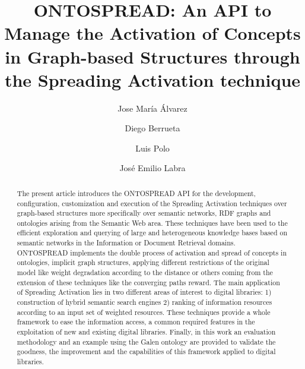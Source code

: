 \documentclass{llncs}
\begin{document}
\title{ONTOSPREAD: An API to Manage the Activation of Concepts in Graph-based Structures through the Spreading
Activation technique}


\author{Jose Mar\'{i}a \'{A}lvarez \and Diego Berrueta \and Luis Polo
 \and Jos\'{e} Emilio Labra} 







\maketitle

\begin{abstract}
The present article introduces the ONTOSPREAD API for the development,
configuration, customization and execution of the Spreading Activation
techniques over graph-based structures more specifically over semantic networks, 
RDF graphs and ontologies arising from the Semantic Web area. These techniques have been used to
the efficient exploration and querying of large and heterogeneous knowledge bases 
based on semantic networks in the Information or Document Retrieval domains. 
ONTOSPREAD implements the double process of activation and spread of concepts in ontologies, implicit
graph structures, applying different restrictions of the original model like weight degradation 
according to the distance or others coming from the extension of these techniques like
the converging paths reward. The main application of Spreading Activation
lies in two different areas of interest to digital libraries: 1) construction of hybrid semantic search engines 2) ranking of
information resources according to an input set of weighted resources. These techniques provide a whole framework to ease
the information access, a common required features in the exploitation
of new and existing digital libraries. Finally, in this work an evaluation methodology and 
an example using the Galen ontology are provided to validate the goodness, the improvement and the capabilities of 
this framework applied to digital libraries.
\end{abstract}
\end{document}
